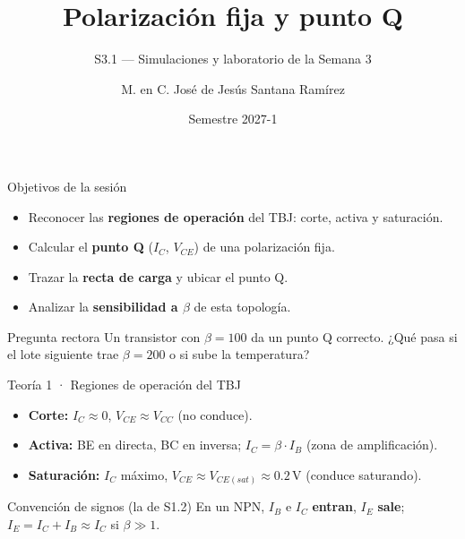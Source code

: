 \documentclass[aspectratio=169]{beamer}
\title[S3.1 · Polarización fija]{Polarización fija y punto Q}
\subtitle{S3.1 — Simulaciones y laboratorio de la Semana 3}
\institute{Licenciatura en Ingeniería Aeroespacial\\ UNAM · ENES Unidad Juriquilla}
\author{M. en C. José de Jesús Santana Ramírez}
\date{Semestre 2027-1}
\begin{document}
\begin{frame}[plain]
  \titlepage
\end{frame}

\begin{frame}{Objetivos de la sesión}
  \begin{itemize}
    \item Reconocer las \textbf{regiones de operación} del TBJ: corte, activa y saturación.
    \item Calcular el \textbf{punto Q} ($I_C$, $V_{CE}$) de una polarización fija.
    \item Trazar la \textbf{recta de carga} y ubicar el punto Q.
    \item Analizar la \textbf{sensibilidad a $\beta$} de esta topología.
  \end{itemize}
  \pause
  \begin{block}{Pregunta rectora}
    Un transistor con $\beta = 100$ da un punto Q correcto. ¿Qué pasa si el lote
    siguiente trae $\beta = 200$ o si sube la temperatura?
  \end{block}
\end{frame}

\begin{frame}{Teoría 1 · Regiones de operación del TBJ}
  \begin{itemize}
    \item \textbf{Corte:} $I_C \approx 0$, $V_{CE} \approx V_{CC}$ (no conduce).
    \item \textbf{Activa:} BE en directa, BC en inversa; $I_C = \beta\cdot I_B$ (zona de amplificación).
    \item \textbf{Saturación:} $I_C$ máximo, $V_{CE} \approx V_{CE(sat)} \approx 0.2\,\text{V}$ (conduce saturando).
  \end{itemize}
  \pause
  \begin{block}{Convención de signos (la de S1.2)}
    En un NPN, $I_B$ e $I_C$ \textbf{entran}, $I_E$ \textbf{sale}; $I_E = I_C + I_B \approx I_C$ si $\beta \gg 1$.
  \end{block}
\end{frame}
\end{document}
